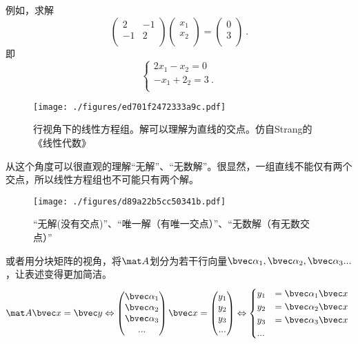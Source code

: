 \begin{example}{}
例如，求解
$$
\begin{pmatrix}
2&-1\\
-1&2\\
\end{pmatrix}
\begin{pmatrix}
x_1\\
x_2\\
\end{pmatrix}
=
\begin{pmatrix}
0\\
3\\
\end{pmatrix}~.
$$
即
$$
\begin{cases}
2x_1-x_2=0\\
-x_1+2_2=3~.\\
\end{cases}
$$
\begin{figure}[ht]
\centering
\texttt{[image: ./figures/ed701f2472333a9c.pdf]}
\caption{行视角下的线性方程组。解可以理解为直线的交点。仿自Strang的《线性代数》} \label{fig_LinEq_2}
\end{figure}
\end{example}
从这个角度可以很直观的理解“无解”、“无数解”。很显然，一组直线不能仅有两个交点，所以线性方程组也不可能只有两个解。
\begin{figure}[ht]
\centering
\texttt{[image: ./figures/d89a22b5cc50341b.pdf]}
\caption{“无解(没有交点)”、“唯一解（有唯一交点）”、“无数解（有无数交点）”} \label{fig_LinEq_3}
\end{figure}

或者用分块矩阵的视角，将$\mat A$划分为若干行向量$\bvec \alpha_1, \bvec \alpha_2,\bvec \alpha_3...$，让表述变得更加简洁。
$$
\mat A \bvec x=\bvec y \Leftrightarrow 
\begin{pmatrix}
\bvec \alpha_1\\
\bvec \alpha_2\\
\bvec \alpha_3\\
...
\end{pmatrix}
\bvec x
=
\begin{pmatrix}
y_{1}\\
y_{2}\\
y_{3}\\
...\\
\end{pmatrix}
\Leftrightarrow 
\begin{cases}
y_1&=\bvec \alpha_1 \bvec x\\
y_2&=\bvec \alpha_2 \bvec x\\
y_3&=\bvec \alpha_3 \bvec x\\
...&\\
\end{cases}~
$$

